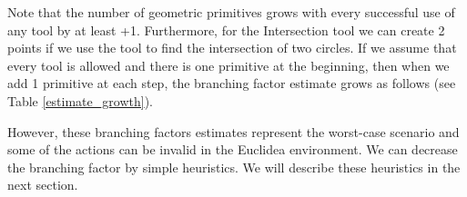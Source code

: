 Note that the number of geometric primitives grows with every successful use of any tool by at least +1. Furthermore, for the Intersection tool we can create 2 points if we use the tool to find the intersection of two circles.
\newline \newline
If we assume that every tool is allowed and there is one primitive at the beginning, then when we add 1 primitive at each step, the branching factor estimate grows as follows (see Table \ref{estimate_growth}).
\newline \newline
\begin{table}[h]
    \caption{Growth of the branching factor estimate (see Section \ref{degrees_of_freedom}). Each step adds one geometric primitive.}
    \label{estimate_growth}
\end{table}
\newline \newline

However, these branching factors estimates represent the worst-case scenario and some of the actions can be invalid in the Euclidea environment. We can decrease the branching factor by simple heuristics. We will describe these heuristics in the next section.


